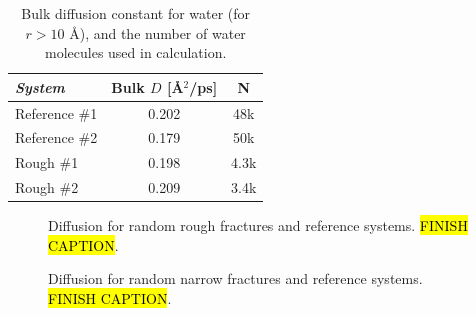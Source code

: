 

%
\begin{table}[!htb]%
    \centering%
    \begin{tabular}{l|cc}%
        \textit{System} & Bulk $D$ [\AA$^2$/ps] & N    \\\hline
        Reference \#1   & 0.202                 & 48k  \\ %
        Reference \#2   & 0.179                 & 50k  \\ %
        Rough \#1       & 0.198                 & 4.3k \\ %
        Rough \#2       & 0.209                 & 3.4k \\ %
    \end{tabular}%
    \vspace{8pt}%
    \caption{%
        Bulk diffusion constant for water (for $r>10$ \AA), and the number of water molecules used in calculation. %
        \label{tab:bulk_water_diffusion}%
    }%
\end{table}

\begin{figure}[htpb]%
    \centering%
    \caption{%
        Diffusion for random rough fractures and reference systems. \hl{FINISH CAPTION}. %
    }%
\end{figure}%

\begin{figure}[htpb]%
    \centering%
    \caption{%
        Diffusion for random narrow fractures and reference systems. \hl{FINISH CAPTION}. %
    }%
\end{figure}%

